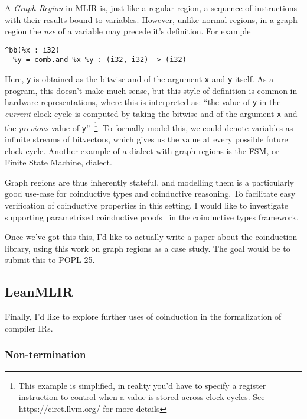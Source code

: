 \documentclass[a4paper]{scrartcl}
\begin{document}
A \emph{Graph Region} in MLIR is, just like a regular region, a sequence
of instructions with their results bound to variables. However, unlike
normal regions, in a graph region the \emph{use} of a variable may
precede it's definition. For example

\begin{verbatim}
^bb(%x : i32)
  %y = comb.and %x %y : (i32, i32) -> (i32)
\end{verbatim}

Here, \texttt{y} is obtained as the bitwise and of the argument
\texttt{x} and \texttt{y} itself. As a program, this doesn't make much
sense, but this style of definition is common in hardware
representations, where this is interpreted as: ``the value of \texttt{y}
in the \emph{current} clock cycle is computed by taking the bitwise and
of the argument \texttt{x} and the \emph{previous} value of \texttt{y}''~\footnote{This example is simplified, in reality you'd have to specify a register instruction to control when a value is stored across clock cycles. See https://circt.llvm.org/ for more details}.
To formally model this, we could denote variables as infinite streams of bitvectors,
which gives us the value at every possible future clock cycle. Another
example of a dialect with graph regions is the FSM, or Finite State
Machine, dialect.

Graph regions are thus inherently stateful, and modelling them is a
particularly good use-case for coinductive types and coinductive
reasoning. To facilitate easy verification of coinductive properties in
this setting, I would like to investigate supporting parametrized
coinductive proofs~\cite{hurPowerParameterizationCoinductive} in
the coinductive types framework.

Once we've got this this, I'd like to actually write a paper about the coinduction library, using this work on graph regions as a case study.
The goal would be to submit this to POPL 25.


\subsection{LeanMLIR}\label{leanmlir}

Finally, I'd like to explore further uses of coinduction in the formalization of compiler IRs.

\subsubsection{Non-termination}\label{non-termination}
\end{document}
